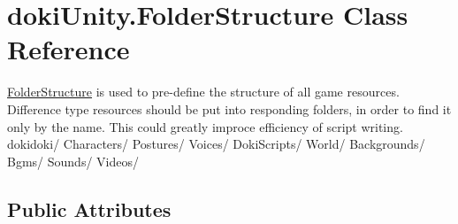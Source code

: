 \hypertarget{classdoki_unity_1_1_folder_structure}{}\section{doki\+Unity.\+Folder\+Structure Class Reference}
\label{classdoki_unity_1_1_folder_structure}


\hyperlink{classdoki_unity_1_1_folder_structure}{Folder\+Structure} is used to pre-\/define the structure of all game resources. Difference type resources should be put into responding folders, in order to find it only by the name. This could greatly improce efficiency of script writing. dokidoki/ Characters/ Postures/ Voices/ Doki\+Scripts/ World/ Backgrounds/ Bgms/ Sounds/ Videos/  


\subsection*{Public Attributes}
